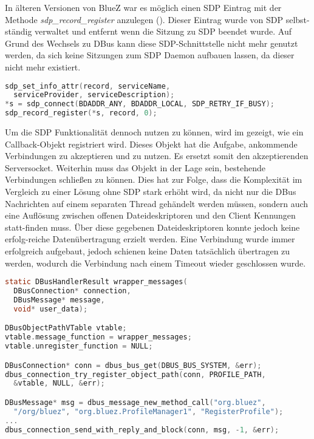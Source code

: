         In älteren Versionen von BlueZ war es möglich einen SDP Eintrag mit der Methode {\it sdp\_record\_register} anzulegen (). Dieser Eintrag wurde von SDP selbst-ständig verwaltet und entfernt wenn die Sitzung zu SDP beendet wurde. Auf Grund des Wechsels zu DBus kann diese SDP-Schnittstelle nicht mehr genutzt werden, da sich keine Sitzungen zum SDP Daemon aufbauen lassen, da dieser nicht mehr existiert.
        
        \begin{lstlisting}[frame=bt, label={lst:bluetooth:sdp}, language=C, caption=Veraltete Nutzung von SDP (Servercode in C)]
sdp_set_info_attr(record, serviceName,
  serviceProvider, serviceDescription);
*s = sdp_connect(BDADDR_ANY, BDADDR_LOCAL, SDP_RETRY_IF_BUSY);
sdp_record_register(*s, record, 0);
        \end{lstlisting}
        
        Um die SDP Funktionalität dennoch nutzen zu können, wird im  gezeigt, wie ein Callback-Objekt registriert wird. Dieses Objekt hat die Aufgabe, ankommende Verbindungen zu akzeptieren und zu nutzen. Es ersetzt somit den akzeptierenden Serversocket. Weiterhin muss das Objekt in der Lage sein, bestehende Verbindungen schließen zu können. Dies hat zur Folge, dass die Komplexität im Vergleich zu einer Lösung ohne SDP stark erhöht wird, da nicht nur die DBus Nachrichten auf einem separaten Thread gehändelt werden müssen, sondern auch eine Auflösung zwischen offenen Dateideskriptoren und den Client Kennungen statt-finden muss.
        Über diese gegebenen Dateideskriptoren konnte jedoch keine erfolg-reiche Datenübertragung erzielt werden. Eine Verbindung wurde immer erfolgreich aufgebaut, jedoch schienen keine Daten tatsächlich übertragen zu werden, wodurch die Verbindung nach einem Timeout wieder geschlossen wurde.
        \pagebreak
    \begin{lstlisting}[frame=bt, label={lst:bluetooth:dbus}, language=C, caption=DBus Nutzung von SDP (Servercode in C)]
static DBusHandlerResult wrapper_messages(
  DBusConnection* connection,
  DBusMessage* message,
  void* user_data);

DBusObjectPathVTable vtable;
vtable.message_function = wrapper_messages;
vtable.unregister_function = NULL;              

DBusConnection* conn = dbus_bus_get(DBUS_BUS_SYSTEM, &err);
dbus_connection_try_register_object_path(conn, PROFILE_PATH,
  &vtable, NULL, &err);

DBusMessage* msg = dbus_message_new_method_call("org.bluez",
  "/org/bluez", "org.bluez.ProfileManager1", "RegisterProfile");
...
dbus_connection_send_with_reply_and_block(conn, msg, -1, &err);
        \end{lstlisting}
        
